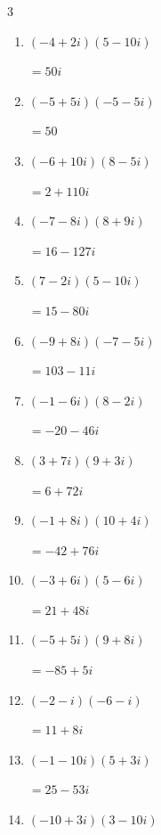 \begin{multicols}{3}
\begin{enumerate}
  \item $\displaystyle (-4+2i)(5-10i)$

        $\displaystyle =50i$

  \item $\displaystyle (-5+5i)(-5-5i)$

        $\displaystyle =50$

  \item $\displaystyle (-6+10i)(8-5i)$

        $\displaystyle =2+110i$

  \item $\displaystyle (-7-8i)(8+9i)$

        $\displaystyle =16-127i$

  \item $\displaystyle (7-2i)(5-10i)$

        $\displaystyle =15-80i$

  \item $\displaystyle (-9+8i)(-7-5i)$

        $\displaystyle =103-11i$

  \item $\displaystyle (-1-6i)(8-2i)$

        $\displaystyle =-20-46i$

\columnbreak %

  \item $\displaystyle (3+7i)(9+3i)$

        $\displaystyle =6+72i$

  \item $\displaystyle (-1+8i)(10+4i)$

        $\displaystyle =-42+76i$

  \item $\displaystyle (-3+6i)(5-6i)$

        $\displaystyle =21+48i$

  \item $\displaystyle (-5+5i)(9+8i)$

        $\displaystyle =-85+5i$

  \item $\displaystyle (-2-i)(-6-i)$

        $\displaystyle =11+8i$

  \item $\displaystyle (-1-10i)(5+3i)$

        $\displaystyle =25-53i$

  \item $\displaystyle (-10+3i)(3-10i)$


\end{enumerate}
\end{multicols}
